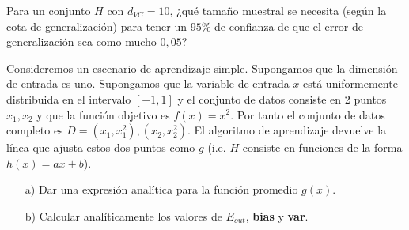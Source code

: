 \documentclass[12pt]{article}
\theoremstyle{definition}
\begin{document}
\begin{pregunta}
Para un conjunto $H$ con $d_{VC}=10$, ¿qué tamaño muestral se necesita (según la cota de generalización) para tener un $95\%$ de confianza de que el error de generalización sea como mucho $0,05$?\\


\end{pregunta}

\begin{pregunta}
Consideremos un escenario de aprendizaje simple. Supongamos que la dimensión de entrada es uno. Supongamos que la variable de entrada $x$ está uniformemente distribuida en el intervalo $[-1,1]$ y el conjunto de datos consiste en 2 puntos ${x_1,x_2}$ y que la función objetivo es $f(x)=x^2$. Por tanto el conjunto de datos completo es $D={(x_1,x_1^2), (x_2,x_2^2)}$. El algoritmo de aprendizaje devuelve la línea que ajusta estos dos puntos como $g$ (i.e. $H$ consiste en funciones de la forma $h(x)=ax+b$).
\begin{enumerate}
\item[a)] Dar una expresión analítica para la función promedio $\overline{g}(x)$.
\item[b)] Calcular analíticamente los valores de $E_{out}$, \textbf{bias} y \textbf{var}.
\end{enumerate}
\textit{ }\\


\end{pregunta}
\end{document}
